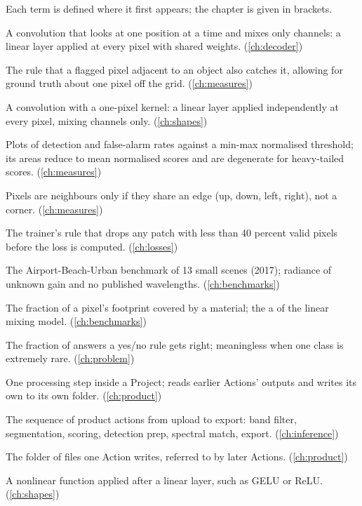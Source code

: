 Each term is defined where it first appears; the chapter is given in brackets.
\begin{description}[style=nextline,leftmargin=1.2em,font=\normalfont\bfseries]
\item[1 by 1 convolution] A convolution that looks at one position at a time and mixes only channels: a linear layer applied at every pixel with shared weights. (\cref{ch:decoder})
\item[1-pixel tolerance] The rule that a flagged pixel adjacent to an object also catches it, allowing for ground truth about one pixel off the grid. (\cref{ch:measures})
\item[1x1 convolution] A convolution with a one-pixel kernel: a linear layer applied independently at every pixel, mixing channels only. (\cref{ch:shapes})
\item[3D ROC] Plots of detection and false-alarm rates against a min-max normalised threshold; its areas reduce to mean normalised scores and are degenerate for heavy-tailed scores. (\cref{ch:measures})
\item[4-connectivity] Pixels are neighbours only if they share an edge (up, down, left, right), not a corner. (\cref{ch:measures})
\item[40 percent rule] The trainer's rule that drops any patch with less than 40 percent valid pixels before the loss is computed. (\cref{ch:losses})
\item[ABU] The Airport-Beach-Urban benchmark of 13 small scenes (2017); radiance of unknown gain and no published wavelengths. (\cref{ch:benchmarks})
\item[Abundance] The fraction of a pixel's footprint covered by a material; the a of the linear mixing model. (\cref{ch:benchmarks})
\item[Accuracy] The fraction of answers a yes/no rule gets right; meaningless when one class is extremely rare. (\cref{ch:problem})
\item[Action] One processing step inside a Project; reads earlier Actions' outputs and writes its own to its own folder. (\cref{ch:product})
\item[Action chain] The sequence of product actions from upload to export: band filter, segmentation, scoring, detection prep, spectral match, export. (\cref{ch:inference})
\item[ActionOutput] The folder of files one Action writes, referred to by later Actions. (\cref{ch:product})
\item[Activation function] A nonlinear function applied after a linear layer, such as GELU or ReLU. (\cref{ch:shapes})

\end{description}
